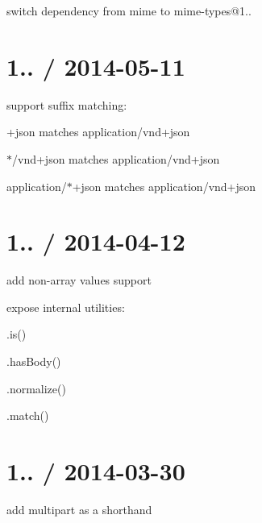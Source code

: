\begin{DoxyItemize}
\item switch dependency from {\ttfamily mime} to {\ttfamily mime-\/types@1..}
\end{DoxyItemize}

\section*{1.. / 2014-\/05-\/11 }


\begin{DoxyItemize}
\item support suffix matching\+:
\begin{DoxyItemize}
\item {\ttfamily +json} matches {\ttfamily application/vnd+json}
\item {\ttfamily $\ast$/vnd+json} matches {\ttfamily application/vnd+json}
\item {\ttfamily application/$\ast$+json} matches {\ttfamily application/vnd+json}
\end{DoxyItemize}
\end{DoxyItemize}

\section*{1.. / 2014-\/04-\/12 }


\begin{DoxyItemize}
\item add non-\/array values support
\item expose internal utilities\+:
\begin{DoxyItemize}
\item {\ttfamily .is()}
\item {\ttfamily .has\+Body()}
\item {\ttfamily .normalize()}
\item {\ttfamily .match()}
\end{DoxyItemize}
\end{DoxyItemize}

\section*{1.. / 2014-\/03-\/30 }


\begin{DoxyItemize}
\item add {\ttfamily multipart} as a shorthand 
\end{DoxyItemize}